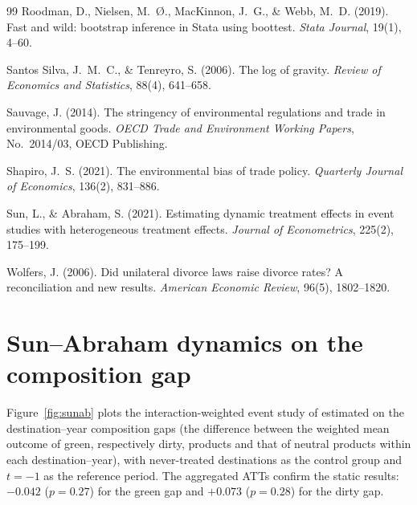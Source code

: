 \documentclass[12pt]{article}
\begin{document}
\begin{thebibliography}{99}
Roodman, D., Nielsen, M.~{\O}., MacKinnon, J.~G., \& Webb, M.~D. (2019).
Fast and wild: bootstrap inference in Stata using boottest.
\emph{Stata Journal}, 19(1), 4--60.

Santos Silva, J.~M.~C., \& Tenreyro, S. (2006).
The log of gravity.
\emph{Review of Economics and Statistics}, 88(4), 641--658.

Sauvage, J. (2014).
The stringency of environmental regulations and trade in environmental goods.
\emph{OECD Trade and Environment Working Papers}, No.~2014/03, OECD Publishing.

Shapiro, J.~S. (2021).
The environmental bias of trade policy.
\emph{Quarterly Journal of Economics}, 136(2), 831--886.

Sun, L., \& Abraham, S. (2021).
Estimating dynamic treatment effects in event studies with heterogeneous treatment effects.
\emph{Journal of Econometrics}, 225(2), 175--199.

Wolfers, J. (2006).
Did unilateral divorce laws raise divorce rates? A reconciliation and new results.
\emph{American Economic Review}, 96(5), 1802--1820.

\end{thebibliography}

\appendix
\section{Sun--Abraham dynamics on the composition gap}\label{app:sunab}

Figure~\ref{fig:sunab} plots the interaction-weighted event study of
\citet{sun2021} estimated on the destination--year composition gaps (the difference
between the weighted mean outcome of green, respectively dirty, products and that of
neutral products within each destination--year), with never-treated destinations as
the control group and $t=-1$ as the reference period. The aggregated ATTs confirm the
static results: $-0.042$ ($p=0.27$) for the green gap and $+0.073$ ($p=0.28$) for the
dirty gap.
\end{document}
